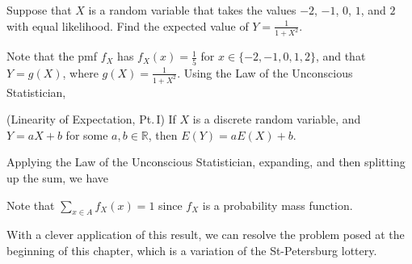 \begin{examp}
Suppose that $X$ is a random variable that takes the values $-2$, $-1$, $0$, $1$, and $2$ with equal likelihood. Find the expected value of $Y = \frac{1}{1+X^2}$.
\par
\noindent Note that the pmf $f_X$ has $f_X(x) = \frac{1}{5}$ for $x \in \{-2,-1,0,1,2\}$, and that $Y = g(X)$, where $g(X) = \frac{1}{1+X^2}$. Using the Law of the Unconscious Statistician,
\end{examp}
\vspace{0.25em}
\par
\begin{cor}\label{LinearityI}
(Linearity of Expectation, Pt.\,I) If $X$ is a discrete random variable, and $Y = aX + b$ for some $a,b \in \mathbb{R}$, then $E(Y) = aE(X)+b$.
\end{cor}
\begin{pf} Applying the Law of the Unconscious Statistician, expanding, and then splitting up the sum, we have
\par
\noindent Note that $\sum_{x \in A}f_X(x) = 1$ since $f_X$ is a probability mass function.
\end{pf}

With a clever application of this result, we can resolve the problem posed at the beginning of this chapter, which is a variation of the St-Petersburg lottery.

